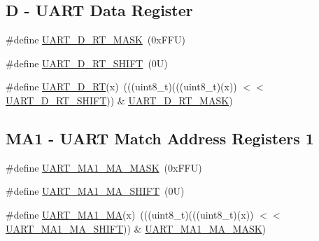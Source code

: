\subsection*{D -\/ U\+A\+RT Data Register}
\begin{DoxyCompactItemize}
\item 
\#define \mbox{\hyperlink{group___u_a_r_t___register___masks_gabb8507803e62ff2f8cc3a3c7f9fc43c2}{U\+A\+R\+T\+\_\+\+D\+\_\+\+R\+T\+\_\+\+M\+A\+SK}}~(0x\+F\+F\+U)
\item 
\#define \mbox{\hyperlink{group___u_a_r_t___register___masks_ga045cb82177942d68eb711a61ee412768}{U\+A\+R\+T\+\_\+\+D\+\_\+\+R\+T\+\_\+\+S\+H\+I\+FT}}~(0\+U)
\item 
\#define \mbox{\hyperlink{group___u_a_r_t___register___masks_ga39c00eb3f36315de588767113f3133cd}{U\+A\+R\+T\+\_\+\+D\+\_\+\+RT}}(x)~(((uint8\+\_\+t)(((uint8\+\_\+t)(x)) $<$$<$ \mbox{\hyperlink{group___u_a_r_t___register___masks_ga045cb82177942d68eb711a61ee412768}{U\+A\+R\+T\+\_\+\+D\+\_\+\+R\+T\+\_\+\+S\+H\+I\+FT}})) \& \mbox{\hyperlink{group___u_a_r_t___register___masks_gabb8507803e62ff2f8cc3a3c7f9fc43c2}{U\+A\+R\+T\+\_\+\+D\+\_\+\+R\+T\+\_\+\+M\+A\+SK}})
\end{DoxyCompactItemize}
\subsection*{M\+A1 -\/ U\+A\+RT Match Address Registers 1}
\begin{DoxyCompactItemize}
\item 
\#define \mbox{\hyperlink{group___u_a_r_t___register___masks_gaa4fe1e60d0ca635fd633af77c3b63998}{U\+A\+R\+T\+\_\+\+M\+A1\+\_\+\+M\+A\+\_\+\+M\+A\+SK}}~(0x\+F\+F\+U)
\item 
\#define \mbox{\hyperlink{group___u_a_r_t___register___masks_ga878daa0e87ec3da2299c223b6b234976}{U\+A\+R\+T\+\_\+\+M\+A1\+\_\+\+M\+A\+\_\+\+S\+H\+I\+FT}}~(0\+U)
\item 
\#define \mbox{\hyperlink{group___u_a_r_t___register___masks_ga6602fd7e07866385c7cd1ad2784fe334}{U\+A\+R\+T\+\_\+\+M\+A1\+\_\+\+MA}}(x)~(((uint8\+\_\+t)(((uint8\+\_\+t)(x)) $<$$<$ \mbox{\hyperlink{group___u_a_r_t___register___masks_ga878daa0e87ec3da2299c223b6b234976}{U\+A\+R\+T\+\_\+\+M\+A1\+\_\+\+M\+A\+\_\+\+S\+H\+I\+FT}})) \& \mbox{\hyperlink{group___u_a_r_t___register___masks_gaa4fe1e60d0ca635fd633af77c3b63998}{U\+A\+R\+T\+\_\+\+M\+A1\+\_\+\+M\+A\+\_\+\+M\+A\+SK}})
\end{DoxyCompactItemize}
